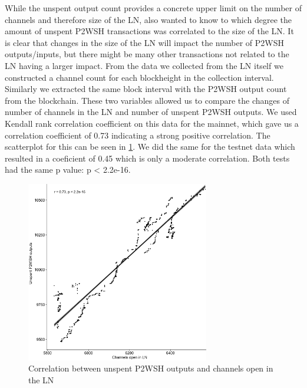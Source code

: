 While the unspent output count provides a concrete upper limit on the number of channels and therefore size of the LN, also wanted to know to which degree the amount of unspent P2WSH transactions was correlated to the size of the LN. It is clear that changes in the size of the LN will impact the number of P2WSH outputs/inputs, but there might be many other transactions not related to the LN having a larger impact. From the data we collected from the LN itself we constructed a channel count for each blockheight in the collection interval. Similarly we extracted the same block interval with the P2WSH output count from the blockchain. These two variables allowed us to compare the changes of number of channels in the LN and number of unspent P2WSH outputs. We used Kendall rank correlation coefficient  on this data for the mainnet, which gave us a correlation coefficient of 0.73 indicating a strong positive correlation. The scatterplot for this can be seen in \cref{fig:correlation}.
We did the same for the testnet data which resulted in a coeficient of 0.45 which is only a moderate correlation. Both tests had the same p value: p < 2.2e-16.

\begin{figure}[ht]
    \centering
    \includegraphics[width=8cm]{figures/graphs/channel_p2wsh_correlation_mainnnet.png}
    \caption{Correlation between unspent P2WSH outputs and channels open in the LN}
    \label{fig:correlation}
\end{figure}

